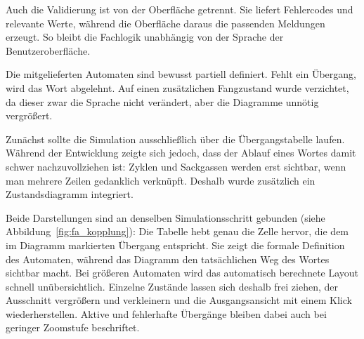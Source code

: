 Auch die Validierung ist von der Oberfläche getrennt.
Sie liefert Fehlercodes und relevante Werte, während die Oberfläche daraus die
passenden Meldungen erzeugt.
So bleibt die Fachlogik unabhängig von der Sprache der Benutzeroberfläche.

Die mitgelieferten Automaten sind bewusst partiell definiert.
Fehlt ein Übergang, wird das Wort abgelehnt.
Auf einen zusätzlichen Fangzustand wurde verzichtet, da dieser zwar die Sprache nicht
verändert, aber die Diagramme unnötig vergrößert.


Zunächst sollte die Simulation ausschließlich über die Übergangstabelle laufen.
Während der Entwicklung zeigte sich jedoch, dass der Ablauf eines Wortes damit schwer
nachzuvollziehen ist: Zyklen und Sackgassen werden erst sichtbar, wenn man mehrere
Zeilen gedanklich verknüpft.
Deshalb wurde zusätzlich ein Zustandsdiagramm integriert.

Beide Darstellungen sind an denselben Simulationsschritt gebunden
(siehe Abbildung~\ref{fig:fa_kopplung}): Die Tabelle hebt
genau die Zelle hervor, die dem im Diagramm markierten Übergang entspricht.
Sie zeigt die formale Definition des Automaten, während das Diagramm den
tatsächlichen Weg des Wortes sichtbar macht.
Bei größeren Automaten wird das automatisch berechnete Layout schnell
unübersichtlich.
Einzelne Zustände lassen sich deshalb frei ziehen, der Ausschnitt vergrößern und
verkleinern und die Ausgangsansicht mit einem Klick wiederherstellen.
Aktive und fehlerhafte Übergänge bleiben dabei auch bei geringer Zoomstufe
beschriftet.

